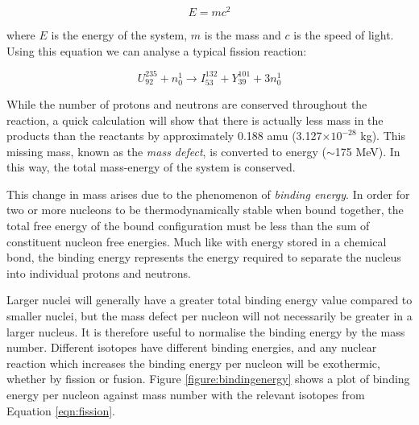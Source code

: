 \begin{equation}
\label{emc2}
    E = mc^{2}
\end{equation}

where $E$ is the energy of the system, $m$ is the mass and $c$ is the speed of light. Using this equation we can analyse a typical fission reaction:

\begin{equation}
    U^{235}_{92} + n^{1}_{0} \longrightarrow I^{132}_{53} + Y^{101}_{39} + 3n^{1}_{0}
\label{eqn:fission} 
\end{equation}

While the number of protons and neutrons are conserved throughout the reaction, a quick calculation will show that there is actually less mass in the products than the reactants by approximately 0.188 amu (3.127$\times 10^{-28}$ kg). This missing mass, known as the \emph{mass defect}, is converted to energy ($\sim$175 MeV). In this way, the total mass-energy of the system is conserved. 

This change in mass arises due to the phenomenon of \emph{binding energy}. In order for two or more nucleons to be thermodynamically stable when bound together, the total free energy of the bound configuration must be less than the sum of constituent nucleon free energies. Much like with energy stored in a chemical bond, the binding energy represents the energy required to separate the nucleus into individual protons and neutrons. 

Larger nuclei will generally have a greater total binding energy value compared to smaller nuclei, but the mass defect per nucleon will not necessarily be greater in a larger nucleus. It is therefore useful to normalise the binding energy by the mass number. Different isotopes have different binding energies, and any nuclear reaction which increases the binding energy per nucleon will be exothermic, whether by fission or fusion. Figure \ref{figure:bindingenergy} shows a plot of binding energy per nucleon against mass number with the relevant isotopes from Equation \ref{eqn:fission}. 





